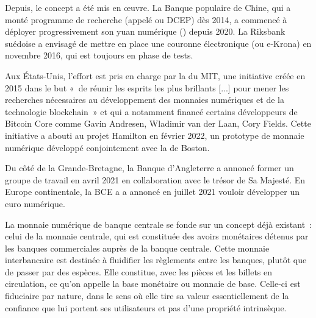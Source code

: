 Depuis, le concept a été mis en œuvre. La Banque populaire de Chine, qui a monté programme de recherche (appelé  ou DCEP) dès 2014, a commencé à déployer progressivement son yuan numérique () depuis 2020. La Riksbank suédoise a envisagé de mettre en place une couronne électronique (ou e-Krona) en novembre 2016, qui est toujours en phase de tests.

Aux États-Unis, l'effort est pris en charge par la  du MIT, une initiative créée en 2015 dans le but «~de réunir les esprits les plus brillants [...] pour mener les recherches nécessaires au développement des monnaies numériques et de la technologie blockchain~» et qui a notamment financé certains développeurs de Bitcoin Core comme Gavin Andresen, Wladimir van der Laan, Cory Fields. Cette initiative a abouti au projet Hamilton en février 2022, un prototype de monnaie numérique développé conjointement avec la  de Boston.

Du côté de la Grande-Bretagne, la Banque d'Angleterre a annoncé former un groupe de travail en avril 2021 en collaboration avec le trésor de Sa Majesté. En Europe continentale, la BCE a a annoncé en juillet 2021 vouloir développer un euro numérique.


La monnaie numérique de banque centrale se fonde sur un concept déjà existant~: celui de la monnaie centrale, qui est constituée des avoirs monétaires détenus par les banques commerciales auprès de la banque centrale. Cette monnaie interbancaire est destinée à fluidifier les règlements entre les banques, plutôt que de passer par des espèces. Elle constitue, avec les pièces et les billets en circulation, ce qu'on appelle la base monétaire ou monnaie de base. Celle-ci est fiduciaire par nature, dans le sens où elle tire sa valeur essentiellement de la confiance que lui portent ses utilisateurs et pas d'une propriété intrinsèque.

